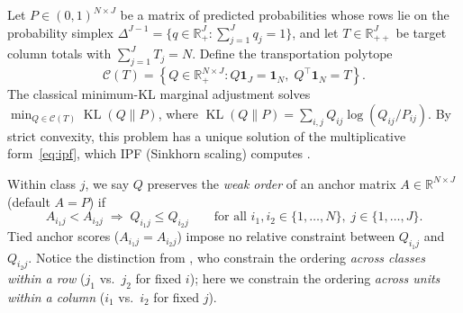 \documentclass[11pt]{article}
\begin{document}
Let $P \in (0,1)^{N \times J}$ be a matrix of predicted probabilities whose rows lie on the probability simplex $\Delta^{J-1} = \{q \in \mathbb{R}_+^J : \sum_{j=1}^J q_j = 1\}$, and let $T \in \mathbb{R}_{++}^J$ be target column totals with $\sum_{j=1}^J T_j = N$. Define the transportation polytope
\[
\mathcal{C}(T) = \left\{ Q \in \mathbb{R}_+^{N \times J} : Q\mathbf{1}_J = \mathbf{1}_N,\; Q^\top \mathbf{1}_N = T \right\}.
\]
The classical minimum-KL marginal adjustment solves $\min_{Q \in \mathcal{C}(T)} \operatorname{KL}(Q \| P)$, where $\operatorname{KL}(Q \| P) = \sum_{i,j} Q_{ij} \log(Q_{ij}/P_{ij})$. By strict convexity, this problem has a unique solution of the multiplicative form~\eqref{eq:ipf}, which IPF (Sinkhorn scaling) computes \citep{ireland1968}.

Within class $j$, we say $Q$ preserves the \emph{weak order} of an anchor matrix $A \in \mathbb{R}^{N \times J}$ (default $A = P$) if
\begin{equation}
A_{i_1 j} < A_{i_2 j} \;\Longrightarrow\; Q_{i_1 j} \le Q_{i_2 j}
\qquad \text{for all } i_1, i_2 \in \{1,\dots,N\},\; j \in \{1,\dots,J\}.
\label{eq:weak_order}
\end{equation}
Tied anchor scores ($A_{i_1 j} = A_{i_2 j}$) impose no relative constraint between $Q_{i_1 j}$ and $Q_{i_2 j}$. Notice the distinction from \citet{rahimi2020}, who constrain the ordering \emph{across classes within a row} ($j_1$ vs.\ $j_2$ for fixed $i$); here we constrain the ordering \emph{across units within a column} ($i_1$ vs.\ $i_2$ for fixed $j$).
\end{document}
